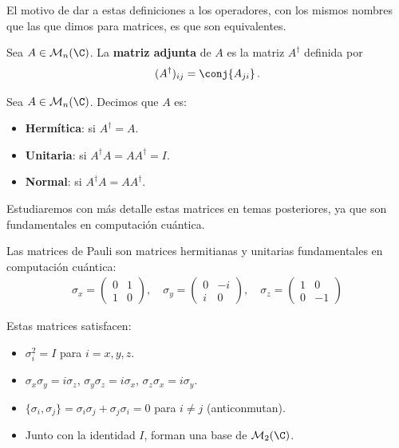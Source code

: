 El motivo de dar a estas definiciones a los operadores, con los mismos nombres que las que dimos para matrices, es que son equivalentes.

\begin{defi}
  Sea $A\in \mathcal{M}_n(\C)$. La \textbf{matriz adjunta} de $A$ es la matriz $A^\dagger$ definida por
  \[
    (A^\dagger)_{ij} = \conj{A_{ji}}\,.
  \]
\end{defi}

\begin{defi}
  Sea $A \in \mathcal{M}_n(\C)$. Decimos que $A$ es:
  \begin{itemize}
    \item
          \textbf{Hermítica}: si $A^\dagger = A$.
    \item
          \textbf{Unitaria}: si $A^\dagger A = AA^\dagger = I$.
    \item
          \textbf{Normal}: si $A^\dagger A = AA^\dagger$.
  \end{itemize}

\end{defi}

Estudiaremos con más detalle estas matrices en temas posteriores, ya que son fundamentales en computación cuántica.

\begin{eje}
  Las matrices de Pauli son matrices hermitianas y unitarias fundamentales en computación cuántica:
  \begin{align}
    \sigma_x = \begin{pmatrix} 0 & 1 \\ 1 & 0 \end{pmatrix}, \quad
    \sigma_y = \begin{pmatrix} 0 & -i \\ i & 0 \end{pmatrix}, \quad
    \sigma_z = \begin{pmatrix} 1 & 0 \\ 0 & -1 \end{pmatrix}
  \end{align}

  Estas matrices satisfacen:
  \begin{itemize}
    \item $\sigma_i^2 = I$ para $i = x, y, z$.
    \item $\sigma_x\sigma_y = i\sigma_z$, $\sigma_y\sigma_z = i\sigma_x$, $\sigma_z\sigma_x = i\sigma_y$.
    \item $\{\sigma_i, \sigma_j\} = \sigma_i\sigma_j + \sigma_j\sigma_i = 0$ para $i \neq j$ (anticonmutan).
    \item Junto con la identidad $I$, forman una base de $\mathcal{M}_2(\C)$.
  \end{itemize}
\end{eje}

